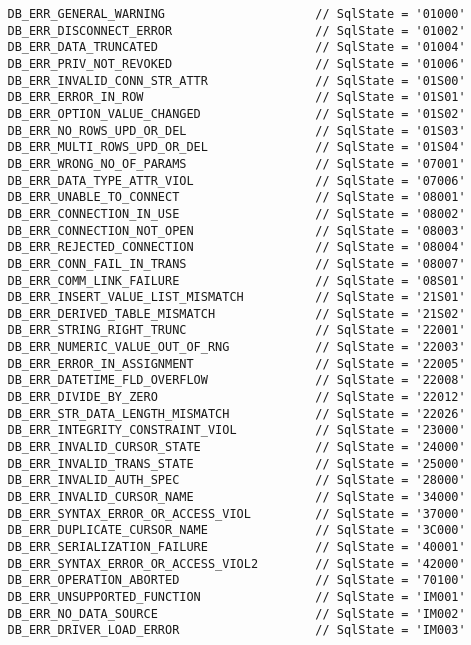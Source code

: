 \begin{verbatim}
   DB_ERR_GENERAL_WARNING                     // SqlState = '01000'
   DB_ERR_DISCONNECT_ERROR                    // SqlState = '01002'
   DB_ERR_DATA_TRUNCATED                      // SqlState = '01004'
   DB_ERR_PRIV_NOT_REVOKED                    // SqlState = '01006'
   DB_ERR_INVALID_CONN_STR_ATTR               // SqlState = '01S00'
   DB_ERR_ERROR_IN_ROW                        // SqlState = '01S01'
   DB_ERR_OPTION_VALUE_CHANGED                // SqlState = '01S02'
   DB_ERR_NO_ROWS_UPD_OR_DEL                  // SqlState = '01S03'
   DB_ERR_MULTI_ROWS_UPD_OR_DEL               // SqlState = '01S04'
   DB_ERR_WRONG_NO_OF_PARAMS                  // SqlState = '07001'
   DB_ERR_DATA_TYPE_ATTR_VIOL                 // SqlState = '07006'
   DB_ERR_UNABLE_TO_CONNECT                   // SqlState = '08001'
   DB_ERR_CONNECTION_IN_USE                   // SqlState = '08002'
   DB_ERR_CONNECTION_NOT_OPEN                 // SqlState = '08003'
   DB_ERR_REJECTED_CONNECTION                 // SqlState = '08004'
   DB_ERR_CONN_FAIL_IN_TRANS                  // SqlState = '08007'
   DB_ERR_COMM_LINK_FAILURE                   // SqlState = '08S01'
   DB_ERR_INSERT_VALUE_LIST_MISMATCH          // SqlState = '21S01'
   DB_ERR_DERIVED_TABLE_MISMATCH              // SqlState = '21S02'
   DB_ERR_STRING_RIGHT_TRUNC                  // SqlState = '22001'
   DB_ERR_NUMERIC_VALUE_OUT_OF_RNG            // SqlState = '22003'
   DB_ERR_ERROR_IN_ASSIGNMENT                 // SqlState = '22005'
   DB_ERR_DATETIME_FLD_OVERFLOW               // SqlState = '22008'
   DB_ERR_DIVIDE_BY_ZERO                      // SqlState = '22012'
   DB_ERR_STR_DATA_LENGTH_MISMATCH            // SqlState = '22026'
   DB_ERR_INTEGRITY_CONSTRAINT_VIOL           // SqlState = '23000'
   DB_ERR_INVALID_CURSOR_STATE                // SqlState = '24000'
   DB_ERR_INVALID_TRANS_STATE                 // SqlState = '25000'
   DB_ERR_INVALID_AUTH_SPEC                   // SqlState = '28000'
   DB_ERR_INVALID_CURSOR_NAME                 // SqlState = '34000'
   DB_ERR_SYNTAX_ERROR_OR_ACCESS_VIOL         // SqlState = '37000'
   DB_ERR_DUPLICATE_CURSOR_NAME               // SqlState = '3C000'
   DB_ERR_SERIALIZATION_FAILURE               // SqlState = '40001'
   DB_ERR_SYNTAX_ERROR_OR_ACCESS_VIOL2        // SqlState = '42000'
   DB_ERR_OPERATION_ABORTED                   // SqlState = '70100'
   DB_ERR_UNSUPPORTED_FUNCTION                // SqlState = 'IM001'
   DB_ERR_NO_DATA_SOURCE                      // SqlState = 'IM002'
   DB_ERR_DRIVER_LOAD_ERROR                   // SqlState = 'IM003'

\end{verbatim}
